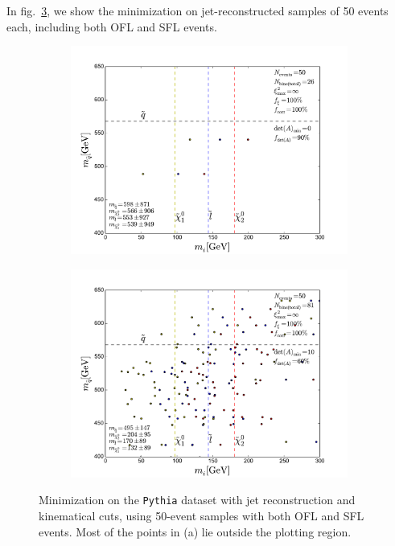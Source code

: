 \documentclass[twoside,english]{uiofysmaster}
\begin{document}
In fig.\ \ref{fig:event-pair-A-selection_pythia_4combosum-jetrec-OSFL-50events}, we show the minimization on jet-reconstructed samples of 50 events each, including both OFL and SFL events. 
\begin{figure}[hbt]
	\centering
	\begin{subfigure}[b]{0.45\textwidth}
		\includegraphics[width=\textwidth]{figures/improving_combinatorics/pythia_jetrec_50evbins_nodetAcut-nosmear_TMP.pdf} 
		\caption{ }
		\label{fig:event-pair-A-selection_pythia_4combosum-jetrec-OSFL-50events_a}
	\end{subfigure}
	\begin{subfigure}[b]{0.45\textwidth}
		\includegraphics[width=\textwidth]{figures/improving_combinatorics/pythia_jetrec_50evbins_detAcut10-nosmear_TMP.pdf}
		\caption{ }
		\label{fig:event-pair-A-selection_pythia_4combosum-jetrec-OSFL-50events_b} 
	\end{subfigure}
	\caption{Minimization on the {\tt Pythia} dataset with jet reconstruction and kinematical cuts, using 50-event samples with both OFL and SFL events. Most of the points in (a) lie outside the plotting region.}
	\label{fig:event-pair-A-selection_pythia_4combosum-jetrec-OSFL-50events}
\end{figure}
\end{document}
